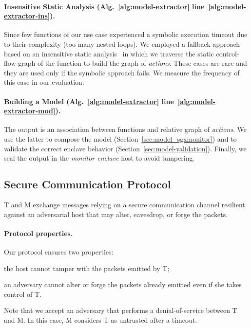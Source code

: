 \paragraph{Insensitive Static Analysis (Alg.~\ref{alg:model-extractor} 	
	line~\ref{alg:model-extractor-ins}).}
Since few functions of our use case experienced a symbolic execution timeout 
due to their complexity (\ie too many nested loops).
We employed a fallback approach based on an insensitive static 
analysis~\citep{sarkar2007flow} in which we traverse the static 
control-flow-graph of the function to build the graph of \emph{actions}.
These cases are rare and they are used only if the symbolic approach fails.
We measure the frequency of this case in our evaluation.

\paragraph{Building a Model (Alg.~\ref{alg:model-extractor} 	
	line~\ref{alg:model-extractor-mod}).}
The output is an association between functions and relative graph of 
\emph{actions}.
We use the latter to compose the model (Section~\ref{sec:model_sgxmonitor}) and 
to 
validate the correct enclave behavior (Section~\ref{sec:model-validation}).
Finally, we seal the output in the \emph{monitor enclave} host to avoid 
tampering.

\subsection{Secure Communication Protocol}
\label{ssec:secure-communication-protocol}

T and M exchange messages relying on a secure communication channel resilient 
against an adversarial host that may alter, eavesdrop, or forge the packets.

\paragraph{Protocol properties.}
Our protocol ensures two properties:
\begin{enumerate*}[label=(\roman*)]
	\item the host cannot tamper with the packets emitted by T;
	\item an adversary cannot alter or forge the packets already emitted even 
	if she takes control of T.
\end{enumerate*}
Note that we accept an adversary that performs a denial-of-service between T 
and M.
In this case, M considers T as untrusted after a timeout.

